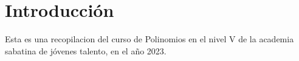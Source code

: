 \newpage
\section{Introducción}

Esta es una recopilacion del curso de Polinomios en el nivel V de la academia sabatina de jóvenes talento, en el año 2023.